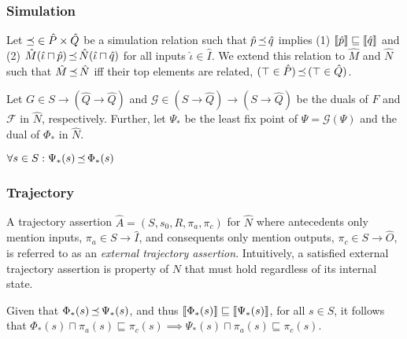 
\subsubsection{Simulation} Let $\operatorname{\mathrel{\preceq}} \in \hat P \times \hat Q$ be a simulation relation such that $\hat p \operatorname{\mathrel{\preceq}} \hat q$ implies (1) $\llbracket\hat p\rrbracket \sqsubseteq \llbracket\hat q\rrbracket$ and (2) $\hat M(\hat \iota \sqcap \hat p) \operatorname{\mathrel{\preceq}} \hat N(\hat \iota \sqcap \hat q)$ for all inputs $\hat \iota \in \hat I$. We extend this relation to $\hat M$ and $\hat N$ such that $\hat M \operatorname{\mathrel{\preceq}} \hat N$ iff their top elements are related, $(\top \in \hat P) \operatorname{\mathrel{\preceq}} \, (\top \in \hat Q)$.






Let $G \in S \rightarrow (\hat Q \rightarrow \hat Q)$ and $\mathcal{G} \in (S \rightarrow \hat Q) \rightarrow (S \rightarrow \hat Q)$ be the duals of $F$ and $\mathcal{F}$ in $\hat N$, respectively. Further, let $\Psi_{*}$ be the least fix point of $\Psi = \mathcal{G}(\Psi)$ and the dual of $\Phi_{*}$ in $\hat N$.

\begin{lemma}
$\forall s \in S : \Psi_{*}(s) \operatorname{\mathrel{\preceq}} \Phi_{*}(s)$
\end{lemma}

\subsubsection{Trajectory} A trajectory assertion $\hat A = (S,s_{0},R,\pi_{a},\pi_{c})$ for $\hat N$ where antecedents only mention inputs, $\pi_{a} \in S \rightarrow \hat I$, and consequents only mention outputs, $\pi_{c} \in S \rightarrow \hat O$, is referred to as an \textit{external trajectory assertion}. Intuitively, a satisfied external trajectory assertion is property of $N$ that must hold regardless of its internal state.

Given that $\Phi_{*}(s) \operatorname{\mathrel{\preceq}} \Psi_{*}(s)$, and thus $\llbracket\Phi_{*}(s)\rrbracket \sqsubseteq \llbracket\Psi_{*}(s)\rrbracket$, for all $s \in S$, it follows that $\Phi_{*}(s) \sqcap \pi_{a}(s) \sqsubseteq \pi_{c}(s) \implies \Psi_{*}(s) \sqcap \pi_{a}(s) \sqsubseteq \pi_{c}(s)$.

